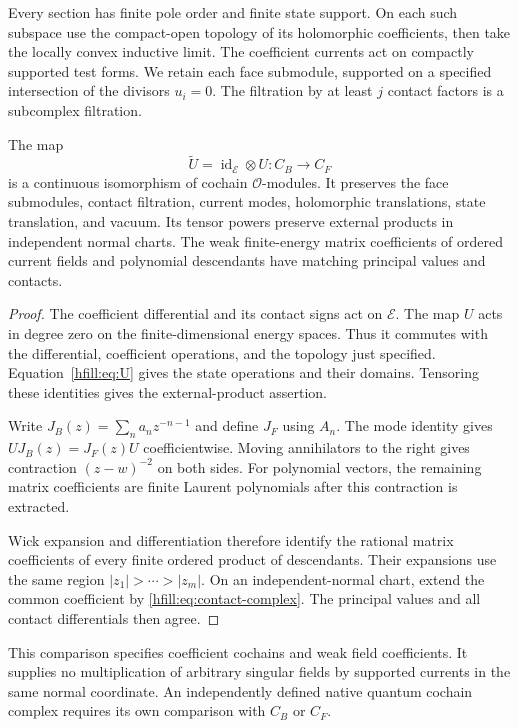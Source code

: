 Every section has finite pole order and finite state support.
On each such subspace use the compact-open topology of its holomorphic
coefficients, then take the locally convex inductive limit.
The coefficient currents act on compactly supported test forms.
We retain each face submodule, supported on a specified intersection
of the divisors $u_i=0$.
The filtration by at least $j$ contact factors is a subcomplex filtration.

\begin{proposition}\label{hfill:prop:relative}
The map
\[
 \widetilde U=\operatorname{id}_{\mathcal E}\otimes U:
 C_B\longrightarrow C_F
\]
is a continuous isomorphism of cochain $\mathcal O$-modules.
It preserves the face submodules, contact filtration, current modes,
holomorphic translations, state translation, and vacuum.
Its tensor powers preserve external products in independent normal charts.
The weak finite-energy matrix coefficients of ordered current fields
and polynomial descendants have matching principal values and contacts.
\end{proposition}

\begin{proof}
The coefficient differential and its contact signs act on $\mathcal E$.
The map $U$ acts in degree zero on the finite-dimensional energy spaces.
Thus it commutes with the differential, coefficient operations, and
the topology just specified.
Equation~\eqref{hfill:eq:U} gives the state operations and their domains.
Tensoring these identities gives the external-product assertion.

Write $J_B(z)=\sum_n a_nz^{-n-1}$ and define $J_F$ using $A_n$.
The mode identity gives $UJ_B(z)=J_F(z)U$ coefficientwise.
Moving annihilators to the right gives contraction $(z-w)^{-2}$ on
both sides.
For polynomial vectors, the remaining matrix coefficients are finite
Laurent polynomials after this contraction is extracted.

Wick expansion and differentiation therefore identify the rational
matrix coefficients of every finite ordered product of descendants.
Their expansions use the same region $|z_1|>\cdots>|z_m|$.
On an independent-normal chart, extend the common coefficient by
\eqref{hfill:eq:contact-complex}.
The principal values and all contact differentials then agree.
\end{proof}

This comparison specifies coefficient cochains and weak field coefficients.
It supplies no multiplication of arbitrary singular fields by supported
currents in the same normal coordinate.
An independently defined native quantum cochain complex requires its
own comparison with $C_B$ or $C_F$.


